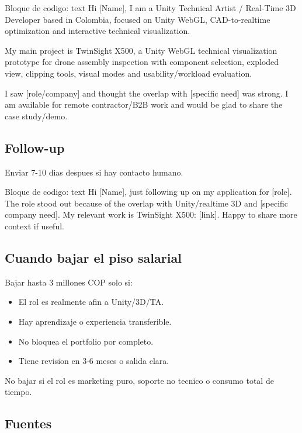 \begin{mdcode}
Bloque de codigo: text
Hi [Name], I am a Unity Technical Artist / Real-Time 3D Developer based in Colombia, focused on Unity WebGL, CAD-to-realtime optimization and interactive technical visualization.

My main project is TwinSight X500, a Unity WebGL technical visualization prototype for drone assembly inspection with component selection, exploded view, clipping tools, visual modes and usability/workload evaluation.

I saw [role/company] and thought the overlap with [specific need] was strong. I am available for remote contractor/B2B work and would be glad to share the case study/demo.
\end{mdcode}


\subsection{Follow-up}


Enviar 7-10 dias despues si hay contacto humano.


\begin{mdcode}
Bloque de codigo: text
Hi [Name], just following up on my application for [role]. The role stood out because of the overlap with Unity/realtime 3D and [specific company need]. My relevant work is TwinSight X500: [link]. Happy to share more context if useful.
\end{mdcode}


\subsection{Cuando bajar el piso salarial}


Bajar hasta 3 millones COP solo si:


\begin{itemize}
\item El rol es realmente afin a Unity/3D/TA.
\item Hay aprendizaje o experiencia transferible.
\item No bloquea el portfolio por completo.
\item Tiene revision en 3-6 meses o salida clara.
\end{itemize}


No bajar si el rol es marketing puro, soporte no tecnico o consumo total de tiempo.


\subsection{Fuentes}


